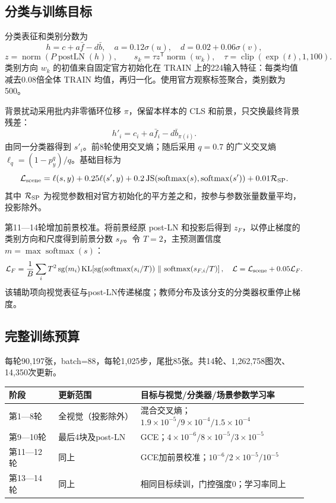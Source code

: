 \documentclass[UTF8,fontset=none,zihao=-4]{ctexart}
\newcommand{\norm}[1]{\operatorname{norm}\!\left(#1\right)}
\newcommand{\sm}{\operatorname{softmax}}
\newcommand{\sg}{\operatorname{sg}}
\begin{document}
\subsection*{分类与训练目标}
分类表征和类别分数为
\[
h=c+a\bar f-d\bar b,\quad
a=0.12\sigma(u),\quad d=0.02+0.06\sigma(v),
\]
\[
z=\norm{P\operatorname{postLN}(h)},\qquad
s_k=\tau z^{\mathsf T}\norm{w_k},\quad \tau=\operatorname{clip}(\exp(t),1,100).
\]
类别方向 $w_k$ 的初值来自固定官方初始化在 TRAIN 上的224输入特征：每类均值减去0.08倍全体 TRAIN 均值，再归一化。使用官方观察标签聚合，类别数为500。

背景扰动采用批内非零循环位移 $\pi$，保留本样本的 CLS 和前景，只交换最终背景残差：
\[
h'_i=c_i+a\bar f_i-d\bar b_{\pi(i)}.
\]
由同一分类器得到 $s'_i$。前8轮使用交叉熵；随后采用 $q=0.7$ 的广义交叉熵 $\ell_q=(1-p_y^q)/q$。基础目标为
\[
\mathcal L_{\rm scene}=\ell(s,y)+0.25\ell(s',y)
+0.2\operatorname{JS}(\sm(s),\sm(s'))+0.01\mathcal R_{\rm SP}.
\]
其中 $\mathcal R_{\rm SP}$ 为视觉参数相对官方初始化的平方差之和，按参与参数张量数量平均，投影除外。

第11—14轮增加前景校准。将前景经原 post-LN 和投影后得到 $z_F$，以停止梯度的类别方向和尺度得到前景分数 $s_F$。令 $T=2$，主预测置信度 $m=\max\sm(s)$：
\[
\mathcal L_F=\frac1B\sum_i T^2\sg(m_i)
\operatorname{KL}\!\left[\sg\!\left(\sm(s_i/T)\right)\,\|\,\sm(s_{F,i}/T)\right],
\quad \mathcal L=\mathcal L_{\rm scene}+0.05\mathcal L_F.
\]
该辅助项向视觉表征与post-LN传递梯度；教师分布及该分支的分类器权重停止梯度。

\subsection*{完整训练预算}
每轮90,197张，batch=88，每轮1,025步，尾批85张。共14轮、1,262,758图次、14,350次更新。
\begin{center}\small
\begin{tabularx}{\textwidth}{@{}p{1.7cm}p{2.7cm}X@{}}\toprule
阶段 & 更新范围 & 目标与视觉/分类器/场景参数学习率\\\midrule
第1—8轮 & 全视觉（投影除外） & 混合交叉熵；$1.9\!\times\!10^{-5}/9\!\times\!10^{-4}/1.5\!\times\!10^{-4}$\\
第9—10轮 & 最后4块及post-LN & GCE；$4\!\times\!10^{-6}/8\!\times\!10^{-5}/3\!\times\!10^{-5}$\\
第11—12轮 & 同上 & GCE加前景校准；$10^{-6}/2\!\times\!10^{-5}/10^{-5}$\\
第13—14轮 & 同上 & 相同目标续训，门控强度0；学习率同上\\\bottomrule
\end{tabularx}
\end{center}
\end{document}
